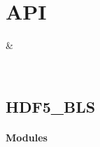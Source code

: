 \documentclass[letterpaper,10pt,english]{sphinxmanual}
\begin{document}
\chapter{API}
\label{\detokenize{index:api}}

\begin{savenotes}\sphinxattablestart
\sphinxthistablewithglobalstyle
\sphinxthistablewithnovlinesstyle
\centering
\begin{tabulary}{\linewidth}[t]{}
\sphinxtoprule
\sphinxtableatstartofbodyhook
\sphinxAtStartPar
{\hyperref[\detokenize{_autosummary/HDF5_BLS:module-HDF5_BLS}]{}}
&
\sphinxAtStartPar

\\
\sphinxbottomrule
\end{tabulary}
\sphinxtableafterendhook\par
\sphinxattableend\end{savenotes}

\sphinxstepscope


\section{HDF5\_BLS}
\label{\detokenize{_autosummary/HDF5_BLS:module-HDF5_BLS}}\label{\detokenize{_autosummary/HDF5_BLS:hdf5-bls}}\label{\detokenize{_autosummary/HDF5_BLS::doc}}\subsubsection*{Modules}
\end{document}
